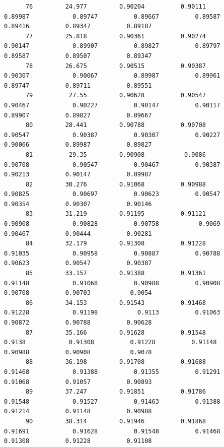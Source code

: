 \documentclass[
]{book}
\begin{document}
\begin{verbatim}
      76         24.977         0.90204          0.90111           0.89987            0.89747          0.89667          0.89587          0.89416          0.89347          0.89187   
      77         25.818         0.90361          0.90274           0.90147            0.89907          0.89827          0.89797          0.89587          0.89507          0.89347   
      78         26.675         0.90515          0.90387           0.90307            0.90067          0.89987          0.89961          0.89747          0.89711          0.89551   
      79          27.55         0.90628          0.90547           0.90467            0.90227          0.90147          0.90117          0.89907          0.89827          0.89667   
      80         28.441         0.90788          0.90708           0.90547            0.90387          0.90307          0.90227          0.90066          0.89987          0.89827   
      81          29.35         0.90908           0.9086           0.90708            0.90547          0.90467          0.90387          0.90213          0.90147          0.89987   
      82         30.276         0.91068          0.90988           0.90825            0.90697          0.90623          0.90547          0.90354          0.90307          0.90146   
      83         31.219         0.91195          0.91121           0.90908            0.90828          0.90758           0.9069          0.90467          0.90444          0.90281   
      84         32.179         0.91308          0.91228           0.91035            0.90958          0.90887          0.90788          0.90623          0.90547          0.90387   
      85         33.157         0.91388          0.91361           0.91148            0.91068          0.90988          0.90908          0.90708          0.90703           0.9054   
      86         34.153         0.91543          0.91468           0.91228            0.91198           0.9113          0.91063          0.90872          0.90788          0.90628   
      87         35.166         0.91628          0.91548            0.9138            0.91308          0.91228          0.91148          0.90988          0.90908           0.9078   
      88         36.198         0.91708          0.91688           0.91468            0.91388          0.91355          0.91291          0.91068          0.91057          0.90893   
      89         37.247         0.91851          0.91786           0.91548            0.91527          0.91463          0.91388          0.91214          0.91148          0.90988   
      90         38.314         0.91946          0.91868           0.91691            0.91628          0.91548          0.91468          0.91308          0.91228          0.91108   

\end{verbatim}
\end{document}
